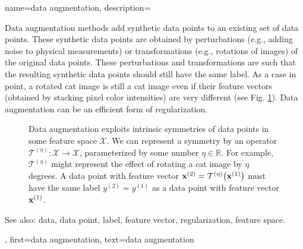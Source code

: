 {
{name={data augmentation},
	description={Data augmentation methods add synthetic data points 
		to an existing set of data points. These synthetic data points are obtained by 
		perturbations (e.g., adding noise to physical measurements) or transformations 
		(e.g., rotations of images) of the original data points. These perturbations and 
		transformations are such that the resulting synthetic data points should 
		still have the same label. As a case in point, a rotated cat image is still 
		a cat image even if their feature vectors (obtained by stacking pixel color intensities) 
		are very different (see Fig. \ref{fig_symmetry_dataaug_dict}). Data augmentation can be an 
		efficient form of regularization.
		\begin{figure}[H]
		\begin{center}
			  \vspace*{-11mm}
		\end{center}
		\caption{Data augmentation exploits intrinsic symmetries of data points in 
		    some feature space $\mathcal{X}$. We can represent a symmetry by 
		    an operator $\mathcal{T}^{(\eta)}: \mathcal{X} \rightarrow \mathcal{X}$,
		    parameterized by some number $\eta \in \mathbb{R}$. For example, $\mathcal{T}^{(\eta)}$ 
		    might represent the effect of rotating a cat image by $\eta$ degrees. A data point 
		    with feature vector ${\bf x}^{(2)} = \mathcal{T}^{(\eta)} \big({\bf x}^{(1)} \big)$ must 
		    have the same label $y^{(2)}=y^{(1)}$ as a data point 
		    with feature vector ${\bf x}^{(1)}$.\label{fig_symmetry_dataaug_dict}}
		 \end{figure}
		See also: data, data point, label, feature vector, regularization, feature space. },
	first={data augmentation},
	text={data augmentation}
}
	
}
